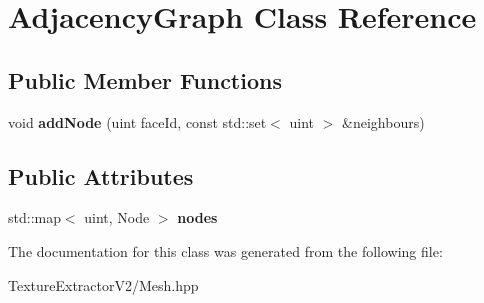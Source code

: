 \hypertarget{class_adjacency_graph}{}\section{Adjacency\+Graph Class Reference}
\label{class_adjacency_graph}
\subsection*{Public Member Functions}
\begin{DoxyCompactItemize}
\item 
\hypertarget{class_adjacency_graph_a24a7cc8e5f62cc94872e04cfa10b70dd}{}void {\bfseries add\+Node} (uint face\+Id, const std\+::set$<$ uint $>$ \&neighbours)\label{class_adjacency_graph_a24a7cc8e5f62cc94872e04cfa10b70dd}

\end{DoxyCompactItemize}
\subsection*{Public Attributes}
\begin{DoxyCompactItemize}
\item 
\hypertarget{class_adjacency_graph_ad3e7a730db698841d4230030898f4291}{}std\+::map$<$ uint, Node $>$ {\bfseries nodes}\label{class_adjacency_graph_ad3e7a730db698841d4230030898f4291}

\end{DoxyCompactItemize}


The documentation for this class was generated from the following file\+:\begin{DoxyCompactItemize}
\item 
Texture\+Extractor\+V2/Mesh.\+hpp\end{DoxyCompactItemize}
